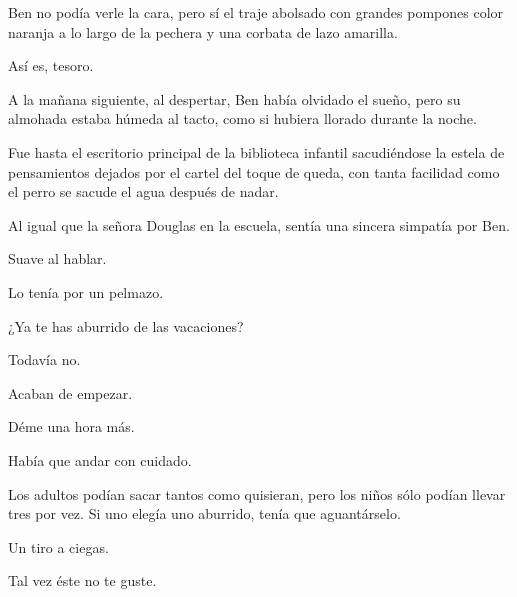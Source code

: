 \sk
Ben no podía verle la cara,
pero sí el traje abolsado con grandes pompones
color naranja a lo largo de la pechera y una corbata
de lazo amarilla.

\sk
Así es, tesoro. 

\sk
A la mañana siguiente, al despertar, Ben había
olvidado el sueño, pero su almohada estaba
húmeda al tacto, como si hubiera llorado durante la
noche.

\sk
Fue hasta el escritorio principal de la biblioteca
infantil sacudiéndose la estela de pensamientos
dejados por el cartel del toque de queda, con tanta
facilidad como el perro se sacude el agua después
de nadar.

\sk
Al igual que la señora Douglas en la escuela, sentía
una sincera simpatía por Ben.

\sk
Suave al hablar. 

\sk
Lo tenía por un pelmazo. 

\sk
¿Ya te has aburrido de las vacaciones?

\sk
Todavía no. 

\sk
Acaban de empezar. 

\sk
Déme una hora más.

\sk
Había que andar con cuidado. 

\sk
Los adultos podían
sacar tantos como quisieran, pero los niños sólo
podían llevar tres por vez. Si uno elegía uno
aburrido, tenía que aguantárselo.

\sk
Un tiro a ciegas. 

\sk
Tal vez éste no te guste. 

